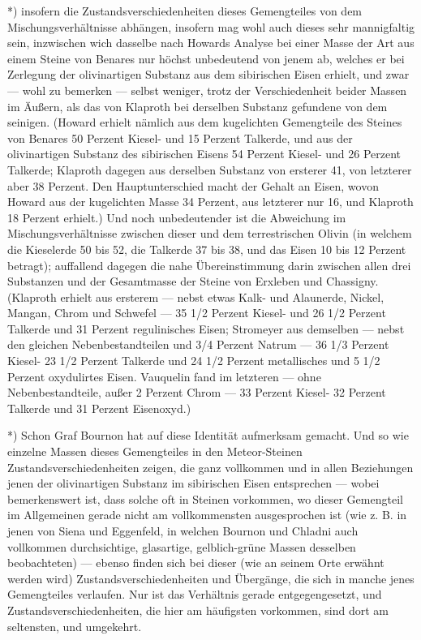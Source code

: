 \documentclass[a4paper, 11pt, oneside, german]{article}
\begin{document}
*) insofern die Zustandsverschiedenheiten dieses Gemengteiles von dem Mischungsverhältnisse abhängen, insofern mag wohl auch dieses sehr mannigfaltig sein, inzwischen wich dasselbe nach Howards Analyse bei einer Masse der Art aus einem Steine von Benares nur höchst unbedeutend von jenem ab, welches er bei Zerlegung der olivinartigen Substanz aus dem sibirischen Eisen erhielt, und zwar --- wohl zu bemerken --- selbst weniger, trotz der Verschiedenheit beider Massen im Äußern, als das von Klaproth bei derselben Substanz gefundene von dem seinigen. (Howard erhielt nämlich aus dem kugelichten Gemengteile des Steines von Benares 50 Perzent Kiesel- und 15 Perzent Talkerde, und aus der olivinartigen Substanz des sibirischen Eisens 54 Perzent Kiesel- und 26 Perzent Talkerde; Klaproth dagegen aus derselben Substanz von ersterer 41, von letzterer aber 38 Perzent. Den Hauptunterschied macht der Gehalt an Eisen, wovon Howard aus der kugelichten Masse 34 Perzent, aus letzterer nur 16, und Klaproth 18 Perzent erhielt.) Und noch unbedeutender ist die Abweichung im Mischungsverhältnisse zwischen dieser und dem terrestrischen Olivin (in welchem die Kieselerde 50 bis 52, die Talkerde 37 bis 38, und das Eisen 10 bis 12 Perzent betragt); auffallend dagegen die nahe Übereinstimmung darin zwischen allen drei Substanzen und der Gesamtmasse der Steine von Erxleben und Chassigny. (Klaproth erhielt aus ersterem --- nebst etwas Kalk- und Alaunerde, Nickel, Mangan, Chrom und Schwefel --- 35 1/2 Perzent Kiesel- und 26 1/2 Perzent Talkerde und 31 Perzent regulinisches Eisen; Stromeyer aus demselben --- nebst den gleichen Nebenbestandteilen und 3/4 Perzent Natrum --- 36 1/3 Perzent Kiesel- 23 1/2 Perzent Talkerde und 24 1/2 Perzent metallisches und 5 1/2 Perzent oxydulirtes Eisen. Vauquelin fand im letzteren --- ohne Nebenbestandteile, außer 2 Perzent Chrom --- 33 Perzent Kiesel- 32 Perzent Talkerde und 31 Perzent Eisenoxyd.)

*) Schon Graf Bournon hat auf diese Identität aufmerksam gemacht. Und so wie einzelne Massen dieses Gemengteiles in den Meteor-Steinen Zustandsverschiedenheiten zeigen, die ganz vollkommen und in allen Beziehungen jenen der olivinartigen Substanz im sibirischen Eisen entsprechen --- wobei bemerkenswert ist, dass solche oft in Steinen vorkommen, wo dieser Gemengteil im Allgemeinen gerade nicht am vollkommensten ausgesprochen ist (wie z. B. in jenen von Siena und Eggenfeld, in welchen Bournon und Chladni auch vollkommen durchsichtige, glasartige, gelblich-grüne Massen desselben beobachteten) --- ebenso finden sich bei dieser (wie an seinem Orte erwähnt werden wird) Zustandsverschiedenheiten und Übergänge, die sich in manche jenes Gemengteiles verlaufen. Nur ist das Verhältnis gerade entgegengesetzt, und Zustandsverschiedenheiten, die hier am häufigsten vorkommen, sind dort am seltensten, und umgekehrt.
\end{document}
